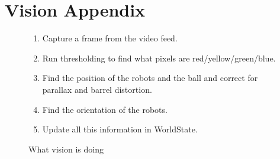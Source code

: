 \section{Vision Appendix}
\label{apx:vision}

\begin{figure}[h]
    \caption{What vision is doing}
    \label{overview}
    \centering
        \begin{enumerate}
            \item Capture a frame from the video feed.
            \item Run thresholding to find what pixels are red/yellow/green/blue.
            \item Find the position of the robots and the ball and correct for parallax and barrel distortion.
            \item Find the orientation of the robots.
            \item Update all this information in WorldState.
        \end{enumerate}
\end{figure}


